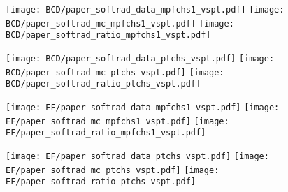 \documentclass[landscape,10pt]{beamer} %
\newcommand{\commentout}[1]{}
\begin{document}
\newpage

\begin{figure}[p]
\centering
  \texttt{[image: BCD/paper\_softrad\_data\_mpfchs1\_vspt.pdf]}
  \texttt{[image: BCD/paper\_softrad\_mc\_mpfchs1\_vspt.pdf]}
  \texttt{[image: BCD/paper\_softrad\_ratio\_mpfchs1\_vspt.pdf]}
\end{figure}

\begin{figure}[p]
\centering
  \texttt{[image: BCD/paper\_softrad\_data\_ptchs\_vspt.pdf]}
  \texttt{[image: BCD/paper\_softrad\_mc\_ptchs\_vspt.pdf]}
  \texttt{[image: BCD/paper\_softrad\_ratio\_ptchs\_vspt.pdf]}
\end{figure}

\newpage

\begin{figure}[p]
\centering
  \texttt{[image: EF/paper\_softrad\_data\_mpfchs1\_vspt.pdf]}
  \texttt{[image: EF/paper\_softrad\_mc\_mpfchs1\_vspt.pdf]}
  \texttt{[image: EF/paper\_softrad\_ratio\_mpfchs1\_vspt.pdf]}
\end{figure}

\begin{figure}[p]
\centering
  \texttt{[image: EF/paper\_softrad\_data\_ptchs\_vspt.pdf]}
  \texttt{[image: EF/paper\_softrad\_mc\_ptchs\_vspt.pdf]}
  \texttt{[image: EF/paper\_softrad\_ratio\_ptchs\_vspt.pdf]}
\end{figure}

\commentout{
\newpage

\begin{figure}[p]
\centering
  \texttt{[image: BCDEFGH/paper\_softrad\_data\_mpfchs1\_vspt.pdf]}
  \texttt{[image: BCDEFGH/paper\_softrad\_mc\_mpfchs1\_vspt.pdf]}
  \texttt{[image: BCDEFGH/paper\_softrad\_ratio\_mpfchs1\_vspt.pdf]}
\end{figure}

\begin{figure}[p]
\centering
  \texttt{[image: BCDEFGH/paper\_softrad\_data\_ptchs\_vspt.pdf]}
  \texttt{[image: BCDEFGH/paper\_softrad\_mc\_ptchs\_vspt.pdf]}
  \texttt{[image: BCDEFGH/paper\_softrad\_ratio\_ptchs\_vspt.pdf]}
\end{figure}
} %
\end{document}
